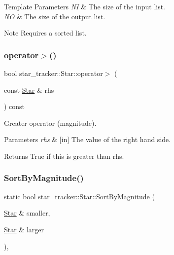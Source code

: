 \begin{DoxyTemplParams}{Template Parameters}
{\em NI} & The size of the input list. \\
\hline
{\em NO} & The size of the output list. \\
\hline
\end{DoxyTemplParams}
\begin{DoxyNote}{Note}
Requires a sorted list. 
\end{DoxyNote}
\mbox{\label{classstar__tracker_1_1Star_af003828866e5fd1b789a3b46dfceb1b5}} 
\subsubsection{\texorpdfstring{operator$>$()}{operator>()}}
{\footnotesize\ttfamily bool star\+\_\+tracker\+::\+Star\+::operator$>$ (\begin{DoxyParamCaption}\item[{const \hyperlink{classstar__tracker_1_1Star}{Star} \&}]{rhs }\end{DoxyParamCaption}) const\hspace{0.3cm}{\ttfamily [inline]}}



Greater operator (magnitude). 


\begin{DoxyParams}{Parameters}
{\em rhs} & \mbox{[}in\mbox{]} The value of the right hand side. \\
\hline
\end{DoxyParams}
\begin{DoxyReturn}{Returns}
True if this is greater than rhs. 
\end{DoxyReturn}
\mbox{\label{classstar__tracker_1_1Star_af06e825ada5958c0c3f60bb118867fac}} 
\subsubsection{\texorpdfstring{Sort\+By\+Magnitude()}{SortByMagnitude()}}
{\footnotesize\ttfamily static bool star\+\_\+tracker\+::\+Star\+::\+Sort\+By\+Magnitude (\begin{DoxyParamCaption}\item[{\hyperlink{classstar__tracker_1_1Star}{Star} \&}]{smaller,  }\item[{\hyperlink{classstar__tracker_1_1Star}{Star} \&}]{larger }\end{DoxyParamCaption})\hspace{0.3cm}{\ttfamily [inline]}, {\ttfamily [static]}}



